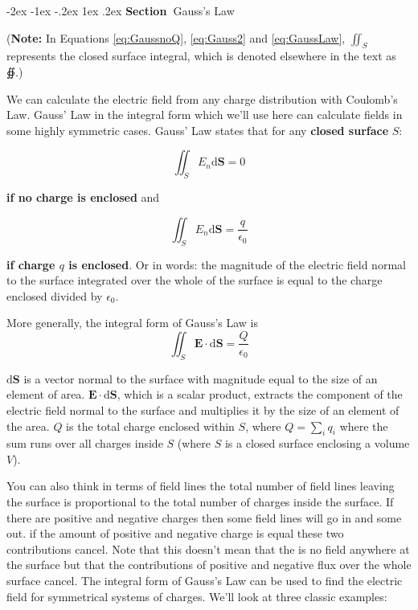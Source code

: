 \documentclass[
]{book}
\makeatletter
\renewcommand\section{%
\@startsection{section}{1}{\z@}%
              {-2ex \@plus -1ex \@minus -.2ex}%
              {1ex \@plus .2ex}%
              {\sffamily\bfseries\large\noindent Section~}}
\numberwithin{equation}{section}
\makeatother
\begin{document}
\hypertarget{gausss-law}{%
\section{Gauss's Law}\label{gausss-law}}

(\textbf{Note:} In Equations \eqref{eq:GaussnoQ}, \eqref{eq:Gauss2} and \eqref{eq:GaussLaw}, \(\iint_S\) represents the closed surface integral, which is denoted elsewhere in the text as ∯.)

We can calculate the electric field from any charge distribution with
Coulomb's Law. Gauss' Law in the integral form which we'll use here can
calculate fields in some highly symmetric cases. Gauss' Law states that
for any \textbf{closed surface} \(S\):

\begin{equation}
\label{eq:GaussnoQ}
\iint_S{E_n} \mathrm{d} \mathbf{S} = 0
\end{equation}

\textbf{if no charge is enclosed} and

\begin{equation}
\label{eq:Gauss2}
\iint_S{E_n} \mathrm{d} \mathbf{S} = \frac{q}{\epsilon_0}
\end{equation}

\textbf{if charge \(q\) is enclosed}. Or in words: the magnitude of the electric field normal to the surface
integrated over the whole of the surface is equal to the charge enclosed
divided by \(\epsilon_0\).

More generally, the integral form of Gauss's Law is
\begin{equation}
\label{eq:GaussLaw} 
\iint_S \mathbf{E} \cdot \mathrm{d} \mathbf{S} =\frac{Q}{\epsilon_0}
\end{equation}

\(\mathrm{d} \mathbf{S}\) is a vector normal to the surface with magnitude equal to the
size of an element of area. \(\mathbf{E} \cdot \mathrm{d} \mathbf{S}\), which is a scalar product,
extracts the component of the electric field normal to the surface and
multiplies it by the size of an element of the area. \(Q\) is the total
charge enclosed within \(S\), where \(Q = \sum_i q_i\) where the sum runs
over all charges inside \(S\) (where \(S\) is a closed surface enclosing a
volume \(V\)).

You can also think in terms of field lines the total number of field
lines leaving the surface is proportional to the total number of charges
inside the surface. If there are positive and negative charges then some
field lines will go in and some out. if the amount of positive and
negative charge is equal these two contributions cancel. Note that this
doesn't mean that the is no field anywhere at the surface but that the
contributions of positive and negative flux over the whole surface
cancel. The integral form of Gauss's Law can be used to find the
electric field for symmetrical systems of charges. We'll look at three
classic examples:
\end{document}
